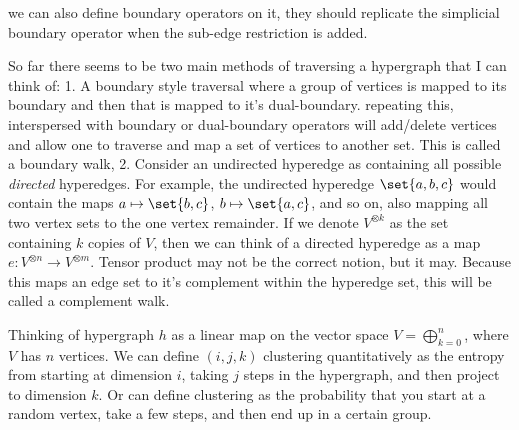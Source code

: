 we can also define boundary operators on it, they should replicate the simplicial boundary operator when the sub-edge restriction is added.

So far there seems to be two main methods of traversing a hypergraph that I can think of: 1. A boundary style traversal where a group of vertices is mapped to its boundary and then that is mapped to it's dual-boundary. repeating this, interspersed with boundary or dual-boundary operators will add/delete vertices and allow one to traverse and map a set of vertices to another set. This is called a boundary walk, 2. Consider an undirected hyperedge as containing all possible \emph{directed} hyperedges. For example, the undirected hyperedge $\set{a,b,c}$ would contain the maps $a \mapsto \set{b,c}$, $b \mapsto \set{a,c}$, and so on, also mapping all two vertex sets to the one vertex remainder. If we denote $V^{\otimes k}$ as the set containing $k$ copies of $V$, then we can think of a directed hyperedge as a map $e: V^{\otimes n} \to V^{\otimes m}$. Tensor product may not be the correct notion, but it may. Because this maps an edge set to it's complement within the hyperedge set, this will be called a complement walk. 


Thinking of hypergraph $h$ as a linear map on the vector space $V = \bigoplus_{k=0}^{n}$, where $V$ has $n$ vertices. We can define $(i,j,k)$ clustering quantitatively as the entropy from starting at dimension $i$, taking $j$ steps in the hypergraph, and then project to dimension $k$. Or can define clustering as the probability that you start at a random vertex, take a few steps, and then end up in a certain group.
